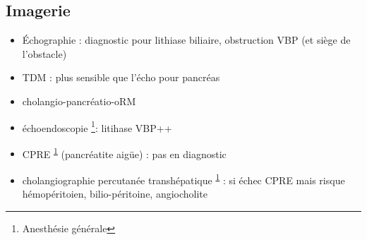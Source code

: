 \documentclass[11pt]{article}
\begin{document}
\subsection{Imagerie}
\label{sec:org0697a26}
\begin{itemize}
\item Échographie : diagnostic pour lithiase biliaire, obstruction VBP (et siège de l'obstacle)
\item TDM : plus sensible que l'écho pour pancréas
\item cholangio-pancréatio-oRM
\item échoendoscopie \footnote{Anesthésie générale\label{org2249f26}}: litihase VBP++
\item \gls{CPRE} \textsuperscript{\ref{org2249f26}} (\danger pancréatite aigüe) : pas en diagnostic
\item cholangiographie percutanée transhépatique \textsuperscript{\ref{org2249f26}} : si échec CPRE mais risque
hémopéritoien, bilio-péritoine, angiocholite
\end{itemize}
\end{document}
